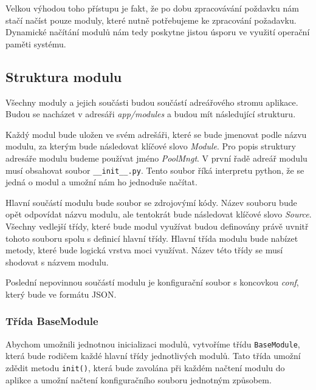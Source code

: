     Velkou výhodou toho přístupu je fakt, že po dobu zpracovávání poždavku nám stačí načíst pouze moduly, které nutně potřebujeme ke zpracování požadavku. Dynamické načítání modulů nám tedy poskytne jistou úsporu ve využití operační paměti systému.
    \subsection{Struktura modulu}
    \label{package}
    Všechny moduly a jejich součásti budou součástí adreářového stromu aplikace. Budou se nacházet v adresáři \emph{app/modules} a budou mít následující strukturu.


    Každý modul bude uložen ve svém adrešáři, které se bude jmenovat podle názvu modulu, za kterým bude následovat klíčové slovo \emph{Module}. Pro popis struktury adresáře modulu budeme používat jméno \emph{PoolMngt}. V první řadě adreář modulu musí obsahovat soubor \verb|__init__.py|. Tento soubor říká interpretu python, že se jedná o modul a umožní nám ho jednoduše načítat.

    Hlavní součástí modulu bude soubor se zdrojovýmí kódy. Název souboru bude opět odpovídat názvu modulu, ale tentokrát bude následovat klíčové slovo \emph{Source}.
    Všechny vedlejší třídy, které bude modul využívat budou definovány právě uvnitř tohoto souboru spolu s definicí hlavní třídy. Hlavní třída modulu bude nabízet metody, které bude logická vrstva moci využívat. Název této třídy se musí shodovat s názvem modulu.

    Poslední nepovinnou součástí modulu je konfigurační soubor s koncovkou \emph{conf}, který bude ve formátu JSON.

    \subsubsection{Třída BaseModule}
    Abychom umožnili jednotnou inicializaci modulů, vytvoříme třídu \verb|BaseModule|, která bude rodičem každé hlavní třídy jednotlivých modulů. Tato třída umožní zdědit metodu \verb|init()|, která bude zavolána při každém načtení modulu do aplikce a umožní načtení konfiguračního souboru jednotným způsobem.

